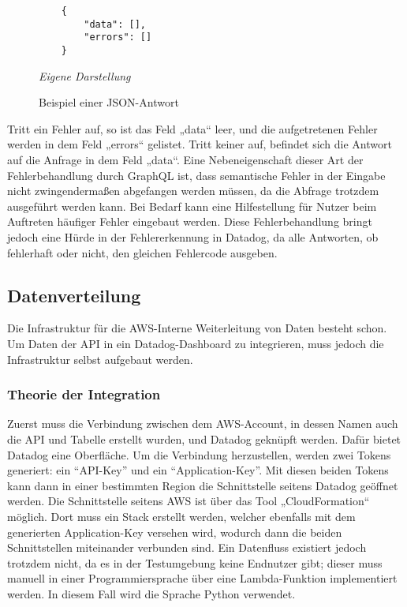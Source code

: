 	\begin{figure}[H]
	\centering
	\begin{minipage}[t]{.7\textwidth} %
	\caption{Beispiel einer JSON-Antwort} %
	\begin{verbatim}
	{
	    "data": [],
	    "errors": []
	}
	\end{verbatim}
	
	\textit{Eigene Darstellung} %
	\label{fig:jsonExample}
	\end{minipage}
	\end{figure}
 
Tritt ein Fehler auf, so ist das Feld „data“ leer, und die aufgetretenen Fehler werden in dem Feld „errors“ gelistet. Tritt keiner auf, befindet sich die Antwort auf die Anfrage in dem Feld „data“. \cite{GraphQL2024b}
Eine Nebeneigenschaft dieser Art der Fehlerbehandlung durch GraphQL ist, dass semantische Fehler in der Eingabe nicht zwingendermaßen abgefangen werden müssen, da die Abfrage trotzdem ausgeführt werden kann. Bei Bedarf kann eine Hilfestellung für Nutzer beim Auftreten häufiger Fehler eingebaut werden. 
Diese Fehlerbehandlung bringt jedoch eine Hürde in der Fehlererkennung in Datadog, da alle Antworten, ob fehlerhaft oder nicht, den gleichen Fehlercode ausgeben.

\subsection{Datenverteilung}
Die Infrastruktur für die AWS-Interne Weiterleitung von Daten besteht schon. Um Daten der API in ein Datadog-Dashboard zu integrieren, muss jedoch die Infrastruktur selbst aufgebaut werden. 

\subsubsection{Theorie der Integration}
Zuerst muss die Verbindung zwischen dem AWS-Account, in dessen Namen auch die API und Tabelle erstellt wurden, und Datadog geknüpft werden. Dafür bietet Datadog eine Oberfläche. Um die Verbindung herzustellen, werden zwei Tokens generiert: ein ``API-Key'' und ein ``Application-Key''. Mit diesen beiden Tokens kann dann in einer bestimmten Region die Schnittstelle seitens Datadog geöffnet werden. Die Schnittstelle seitens AWS ist über das Tool „CloudFormation“ möglich. Dort muss ein Stack erstellt werden, welcher ebenfalls mit dem generierten Application-Key versehen wird, wodurch dann die beiden Schnittstellen miteinander verbunden sind. Ein Datenfluss existiert jedoch trotzdem nicht, da es in der Testumgebung keine Endnutzer gibt; dieser muss manuell in einer Programmiersprache über eine Lambda-Funktion implementiert werden. In diesem Fall wird die Sprache Python verwendet. 

